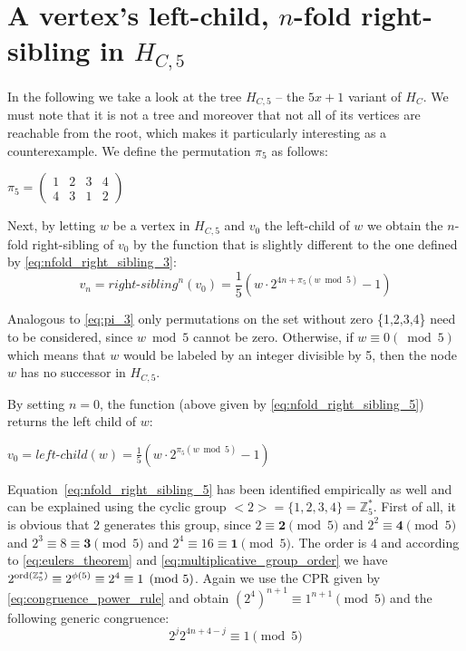 \section{\texorpdfstring{A vertex's left-child, $n$-fold right-sibling in $H_{C,5}$}{A vertex's left-child, n-fold right-sibling in HC5}}
\label{sec:left_child_right_sibling_5}

In the following we take a look at the tree $H_{C,5}$ -- the $5x+1$ variant of $H_C$. We must note that it is not a tree and moreover that not all of its vertices are reachable from the root, which makes it particularly interesting as a counterexample. We define the permutation $\pi_5$ as follows:  
\begin{center}
\label{eq:pi_5}
    $\pi_5=\left(\begin{array}{cccc}
    	1 & 2 & 3 & 4\\
    	4 & 3 & 1 & 2
    \end{array}\right)$	
\end{center}

Next, by letting $w$ be a vertex in $H_{C,5}$ and $v_0$ the left-child of $w$
we obtain the $n$-fold right-sibling of $v_0$ by the function that
is slightly different to the one defined by \ref{eq:nfold_right_sibling_3}:
\begin{equation}
\label{eq:nfold_right_sibling_5}
    v_n=\textit{right-sibling}^n(v_0)=\frac{1}{5}\left(w\cdot2^{4n+\pi_5(w\bmod 5)}-1\right)
\end{equation}

Analogous to \ref{eq:pi_3} only permutations on the set without zero
\{1,2,3,4\} need to be considered, since $w\bmod 5$ cannot be zero.
Otherwise, if $w\equiv 0 (\bmod 5)$ which means that $w$ would be labeled
by an integer divisible by 5, then the node $w$ has no successor in $H_{C,5}$.

\noindent
By setting $n=0$, the function (above given by \ref{eq:nfold_right_sibling_5}) returns the left child of $w$:
\begin{center}
	$v_0=\textit{left-child}(w)=\frac{1}{5}\left(w\cdot2^{\pi_5(w\bmod 5)}-1\right)$
\end{center}

Equation~\ref{eq:nfold_right_sibling_5} has been identified empirically as well and can be explained using the cyclic group $<2>=\{1,2,3,4\}=\mathbb{Z}_5^\ast$. First of all, it is obvious that $2$ generates this group, since $2\equiv\boldsymbol{2}\pmod5$ and $2^2\equiv\boldsymbol{4}\pmod5$ and $2^3\equiv8\equiv\boldsymbol{3}\pmod5$ and $2^4\equiv16\equiv\boldsymbol{1}\pmod5$. The order is $4$ and according to \ref{eq:eulers_theorem} and \ref{eq:multiplicative_group_order} we have $2^{\operatorname{ord}(\mathbb{Z}_5^\ast)}\equiv2^{\phi(5)}\equiv2^4\equiv1\pmod5$. Again we use the CPR given by \ref{eq:congruence_power_rule} and obtain $(2^4)^{n+1}\equiv1^{n+1}\pmod5$ and the following generic congruence:
\begin{equation}
\label{eq:congruence_k5}
2^j2^{4n+4-j}\equiv1\pmod5
\end{equation}

